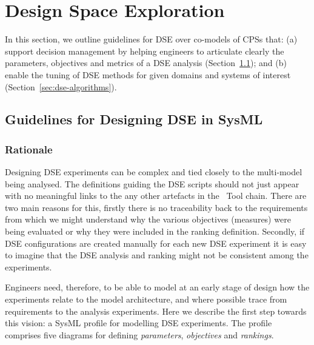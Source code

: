 \chapter{Design Space Exploration}
\label{sec:dse}

In this section, we outline guidelines for  DSE over co-models of CPSs that: (a) support decision management by helping engineers to articulate clearly the parameters, objectives and metrics of a DSE analysis (Section~\ref{sec:dse-sysml}); and (b) enable the tuning of DSE methods for given domains and systems of interest (Section~\ref{sec:dse-algorithms}).
%
%
%
%
%

%
%
%


\section{Guidelines for Designing DSE in SysML}
\label{sec:dse-sysml}
\label{sec:dse-linefollow}

\subsection{Rationale}

Designing DSE experiments can be complex and tied closely to the multi-model being analysed. The definitions guiding the DSE scripts should not just appear with no meaningful links to the any other artefacts in the \into\ Tool  chain. There are two main reasons for this, firstly there is no traceability back to the requirements from which we might understand why the various objectives (measures) were being evaluated or why they were included in the ranking definition.  Secondly, if DSE configurations are created manually for each new DSE experiment it is easy to imagine that the DSE analysis and ranking might not be consistent among the experiments.

Engineers need, therefore, to be able to model at an early stage of design how the experiments relate to the model architecture, and where possible trace from requirements to the analysis experiments. Here we describe the first step towards this vision: a SysML profile for modelling DSE experiments. The profile comprises five diagrams for defining \emph{parameters}, \emph{objectives} and \emph{rankings}.

